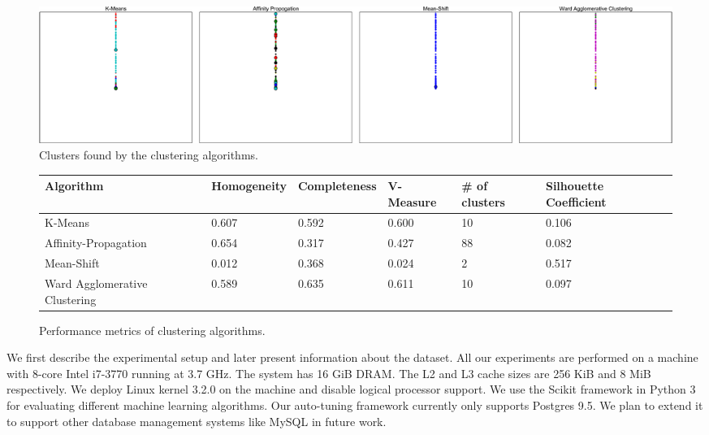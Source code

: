 \begin{figure}
    \centering
    \includegraphics[width=\textwidth]{figure/clustering.pdf}
    \caption{Clusters found by the clustering algorithms.}
    \label{fig:clusters}
\end{figure}

\begin{figure}
    \centering
    \begin{adjustbox}{max width=\textwidth}
    \begin{tabular}{llllll}
      \toprule
      Algorithm                     & Homogeneity & Completeness & V-Measure &
      \# of clusters & Silhouette Coefficient \\
      \midrule
      K-Means                       & 0.607       & 0.592        & 0.600   & 10
      & 0.106  \\
      Affinity-Propagation          & 0.654       & 0.317        & 0.427   & 88
      & 0.082  \\
      Mean-Shift                    & 0.012       & 0.368        & 0.024   & 2
      & 0.517 \\
      Ward Agglomerative Clustering & 0.589       & 0.635        & 0.611   & 10
      & 0.097 \\
      \bottomrule
    \end{tabular}
    \end{adjustbox}
    \caption{Performance metrics of clustering algorithms.}
    \label{fig:clustering-metrics}
\end{figure}

We first describe the experimental setup and later present information about the
dataset.
All our experiments are performed on a machine with 8-core Intel i7-3770 running
at 3.7 GHz. The system has 16 GiB DRAM. The L2 and L3 cache sizes are 256 KiB
and 8 MiB respectively.
We deploy Linux kernel 3.2.0 on the machine and disable logical processor
support.
We use the Scikit \citep{scikit-learn} framework in Python 3 for
evaluating different machine learning algorithms.
Our auto-tuning framework currently only supports Postgres 9.5. We plan to
extend it to support other database management systems like MySQL in future
work.

